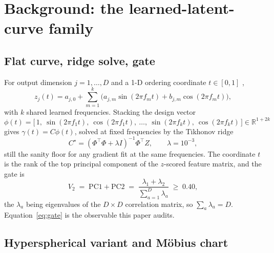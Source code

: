 \documentclass[11pt,a4paper]{article}
\theoremstyle{plain}
\theoremstyle{remark}
\theoremstyle{plain}
\begin{document}
\section{Background: the learned-latent-curve family}
\label{sec:background}

\subsection{Flat curve, ridge solve, gate}

For output dimension $j=1,\dots,D$ and a 1-D ordering coordinate $t\in[0,1]$ \citep{llc2026},
\begin{equation}
z_j(t)=a_{j,0}+\sum_{m=1}^{k}\big(a_{j,m}\sin(2\pi f_mt)+b_{j,m}\cos(2\pi f_mt)\big),
\label{eq:flat}
\end{equation}
with $k$ shared learned frequencies. Stacking the design vector
\begin{equation}
\phi(t)=\big[\,1,\ \sin(2\pi f_1t),\ \cos(2\pi f_1t),\ \dots,\ \sin(2\pi f_kt),\ \cos(2\pi f_kt)\,\big]\in\mathbb{R}^{1+2k}
\label{eq:design}
\end{equation}
gives $\gamma(t)=C\phi(t)$, solved at fixed frequencies by the Tikhonov ridge
\begin{equation}
C^{\star}=(\Phi^{\top}\Phi+\lambda I)^{-1}\Phi^{\top}Z,\qquad \lambda=10^{-3},
\label{eq:ridge}
\end{equation}
still the sanity floor for any gradient fit at the same frequencies. The coordinate $t$ is the rank of the top principal component of the $z$-scored feature matrix, and the gate is
\begin{equation}
V_2\;=\;\mathrm{PC1}+\mathrm{PC2}\;=\;\frac{\lambda_1+\lambda_2}{\sum_{a=1}^{D}\lambda_a}\;\ge\;0.40,
\label{eq:gate}
\end{equation}
the $\lambda_a$ being eigenvalues of the $D\times D$ correlation matrix, so $\sum_a\lambda_a=D$. Equation~\eqref{eq:gate} is the observable this paper audits.

\subsection{Hyperspherical variant and M\"obius chart}
\end{document}
